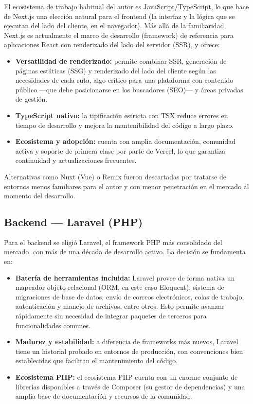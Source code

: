 \documentclass[12pt,a4paper]{article}
\begin{document}
El ecosistema de trabajo habitual del autor es JavaScript/TypeScript, lo que hace de
Next.js una elección natural para el frontend (la interfaz y la lógica que se ejecutan del
lado del cliente, en el navegador). Más allá de la familiaridad, Next.js es actualmente el
marco de desarrollo (framework) de referencia para aplicaciones React con renderizado del
lado del servidor (SSR), y ofrece:

\begin{itemize}[leftmargin=1.5cm]
  \item \textbf{Versatilidad de renderizado:} permite combinar SSR, generación de páginas
        estáticas (SSG) y renderizado del lado del cliente según las necesidades de cada ruta,
        algo crítico para una plataforma con contenido público —que debe posicionarse en los
        buscadores (SEO)— y áreas privadas de gestión.
  \item \textbf{TypeScript nativo:} la tipificación estricta con TSX reduce errores en
        tiempo de desarrollo y mejora la mantenibilidad del código a largo plazo.
  \item \textbf{Ecosistema y adopción:} cuenta con amplia documentación, comunidad activa
        y soporte de primera clase por parte de Vercel, lo que garantiza continuidad
        y actualizaciones frecuentes.
\end{itemize}

Alternativas como Nuxt (Vue) o Remix fueron descartadas por tratarse de entornos menos
familiares para el autor y con menor penetración en el mercado al momento del desarrollo.

\subsection*{Backend — Laravel (PHP)}

Para el backend se eligió Laravel, el framework PHP más consolidado del mercado, con más
de una década de desarrollo activo. La decisión se fundamenta en:

\begin{itemize}[leftmargin=1.5cm]
  \item \textbf{Batería de herramientas incluida:} Laravel provee de forma nativa un mapeador
        objeto-relacional (ORM, en este caso Eloquent), sistema de migraciones de base de datos, envío de correos electrónicos,
        colas de trabajo, autenticación y manejo de archivos, entre otros. Esto permite
        avanzar rápidamente sin necesidad de integrar paquetes de terceros para
        funcionalidades comunes.
  \item \textbf{Madurez y estabilidad:} a diferencia de frameworks más nuevos, Laravel
        tiene un historial probado en entornos de producción, con convenciones bien
        establecidas que facilitan el mantenimiento del código.
  \item \textbf{Ecosistema PHP:} el ecosistema PHP cuenta con un enorme conjunto de
        librerías disponibles a través de Composer (su gestor de dependencias) y una amplia base de documentación y recursos
        de la comunidad.
\end{itemize}
\end{document}
